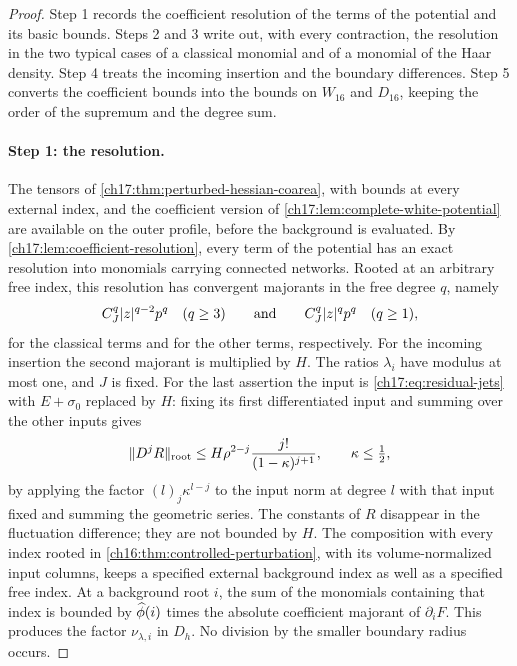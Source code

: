 \begin{proof}
Step 1 records the coefficient resolution of the terms of the potential and its basic bounds. Steps 2 and 3 write out, with every contraction, the resolution in the two typical cases of a classical monomial and of a monomial of the Haar density. Step 4 treats the incoming insertion and the boundary differences. Step 5 converts the coefficient bounds into the bounds on $W_{16}$ and $D_{16}$, keeping the order of the supremum and the degree sum.

\paragraph{Step 1: the resolution.}
The tensors of \cref{ch17:thm:perturbed-hessian-coarea}, with bounds at every external index, and the coefficient version of \cref{ch17:lem:complete-white-potential} are available on the outer profile, before the background is evaluated. By \cref{ch17:lem:coefficient-resolution}, every term of the potential has an exact resolution into monomials carrying connected networks. Rooted at an arbitrary free index, this resolution has convergent majorants in the free degree $q$, namely
\[
 C_J^q\lvert z\rvert^{q-2}p^q\quad(q\ge3)\qquad\text{and}\qquad C_J^q\lvert z\rvert^qp^q\quad(q\ge1),
\]
for the classical terms and for the other terms, respectively. For the incoming insertion the second majorant is multiplied by $H$. The ratios $\lambda_i$ have modulus at most one, and $J$ is fixed. For the last assertion the input is \eqref{ch17:eq:residual-jets} with $E+\sigma_0$ replaced by $H$: fixing its first differentiated input and summing over the other inputs gives
\[
 \lVert D^jR\rVert_{\mathrm{root}}\le H\rho^{2-j}\frac{j!}{(1-\kappa)^{j+1}},\qquad\kappa\le\tfrac12,
\]
by applying the factor $(l)_j\kappa^{l-j}$ to the input norm at degree $l$ with that input fixed and summing the geometric series. The constants of $R$ disappear in the fluctuation difference; they are not bounded by $H$. The composition with every index rooted in \cref{ch16:thm:controlled-perturbation}, with its volume-normalized input columns, keeps a specified external background index as well as a specified free index. At a background root $i$, the sum of the monomials containing that index is bounded by $\widehat\phi(i)$ times the absolute coefficient majorant of $\partial_iF$. This produces the factor $\nu_{\lambda,i}$ in $D_h$. No division by the smaller boundary radius occurs.


\end{proof}
